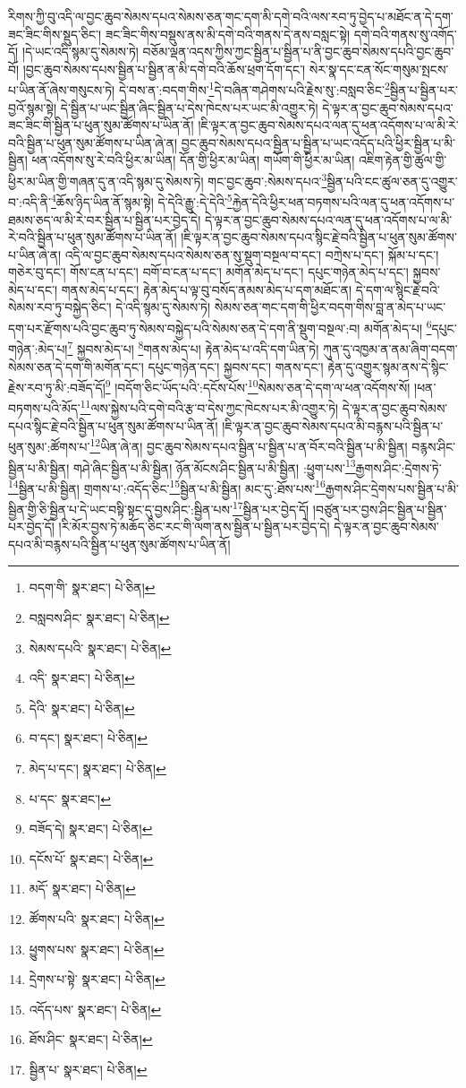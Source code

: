 རིགས་ཀྱི་བུ་འདི་ལ་བྱང་ཆུབ་སེམས་དཔའ་སེམས་ཅན་གང་དག་མི་དགེ་བའི་ལས་རབ་ཏུ་བྱེད་པ་མཐོང་ན་དེ་དག་ཟང་ཟིང་གིས་སྡུད་ཅིང་། ཟང་ཟིང་གིས་བསྡུས་ནས་མི་དགེ་བའི་གནས་དེ་ནས་བསླང་སྟེ། དགེ་བའི་གནས་སུ་འགོད་དོ། །དེ་ཡང་འདི་སྙམ་དུ་སེམས་ཏེ། བཅོམ་ལྡན་འདས་ཀྱིས་ཀྱང་སྦྱིན་པ་སྦྱིན་པ་ནི་བྱང་ཆུབ་སེམས་དཔའི་བྱང་ཆུབ་བོ། །བྱང་ཆུབ་སེམས་དཔས་སྦྱིན་པ་སྦྱིན་ན་མི་དགེ་བའི་ཆོས་ཕྲག་དོག་དང་། སེར་སྣ་དང་ངན་སོང་གསུམ་སྤངས་པ་ཡིན་ནོ་ཞེས་གསུངས་ཏེ། དེ་བས་ན་:བདག་གིས་\footnote{བདག་གི་  སྣར་ཐང་།  པེ་ཅིན། }དེ་བཞིན་གཤེགས་པའི་རྗེས་སུ་:བསླབ་ཅིང་\footnote{བསླབས་ཤིང་  སྣར་ཐང་།  པེ་ཅིན། }སྦྱིན་པ་སྦྱིན་པར་བྱའོ་སྙམ་སྟེ། དེ་སྦྱིན་པ་ཡང་སྦྱིན་ཞིང་སྦྱིན་པ་དེས་ཁེངས་པར་ཡང་མི་འགྱུར་ཏེ། དེ་ལྟར་ན་བྱང་ཆུབ་སེམས་དཔའ་ཟང་ཟིང་གི་སྦྱིན་པ་ཕུན་སུམ་ཚོགས་པ་ཡིན་ནོ། །ཇི་ལྟར་ན་བྱང་ཆུབ་སེམས་དཔའ་ལན་དུ་ཕན་འདོགས་པ་ལ་མི་རེ་བའི་སྦྱིན་པ་ཕུན་སུམ་ཚོགས་པ་ཡིན་ཞེ་ན། བྱང་ཆུབ་སེམས་དཔའ་སྦྱིན་པ་སྦྱིན་པ་ཡང་འདོད་པའི་ཕྱིར་སྦྱིན་པ་མི་སྦྱིན། ཕན་འདོགས་སུ་རེ་བའི་ཕྱིར་མ་ཡིན། དོན་གྱི་ཕྱིར་མ་ཡིན། གཡོག་གི་ཕྱིར་མ་ཡིན། འཇིག་རྟེན་གྱི་ཚུལ་གྱི་ཕྱིར་མ་ཡིན་གྱི་གཞན་དུ་ན་འདི་སྙམ་དུ་སེམས་ཏེ། གང་བྱང་ཆུབ་:སེམས་དཔའ་\footnote{སེམས་དཔའི་  སྣར་ཐང་།  པེ་ཅིན། }སྦྱིན་པའི་ངང་ཚུལ་ཅན་དུ་འགྱུར་བ་:འདི་ནི་\footnote{འདི་  སྣར་ཐང་།  པེ་ཅིན། }ཆོས་ཉིད་ཡིན་ནོ་སྙམ་སྟེ། དེ་དེའི་རྒྱུ་:དེ་དེའི་\footnote{དེའི་  སྣར་ཐང་།  པེ་ཅིན། }རྐྱེན་དེའི་ཕྱིར་ཕན་བཏགས་པའི་ལན་དུ་ཕན་འདོགས་པ་ཐམས་ཅད་ལ་མི་རེ་བར་སྦྱིན་པ་སྦྱིན་པར་བྱེད་དེ། དེ་ལྟར་ན་བྱང་ཆུབ་སེམས་དཔའ་ལན་དུ་ཕན་འདོགས་པ་ལ་མི་རེ་བའི་སྦྱིན་པ་ཕུན་སུམ་ཚོགས་པ་ཡིན་ནོ། །ཇི་ལྟར་ན་བྱང་ཆུབ་སེམས་དཔའ་སྙིང་རྗེ་བའི་སྦྱིན་པ་ཕུན་སུམ་ཚོགས་པ་ཡིན་ཞེ་ན། འདི་ལ་བྱང་ཆུབ་སེམས་དཔའ་སེམས་ཅན་སུ་སྡུག་བསྔལ་བ་དང་། བཀྲེས་པ་དང་། སྐོམ་པ་དང་། གཅེར་བུ་དང་། གོས་ངན་པ་དང་། བགོ་བ་ངན་པ་དང་། མགོན་མེད་པ་དང་། དཔུང་གཉེན་མེད་པ་དང་། སྐྱབས་མེད་པ་དང་། གནས་མེད་པ་དང་། རྟེན་མེད་པ་ལྟ་བུ་བསོད་ནམས་མེད་པ་དག་མཐོང་ན། དེ་དག་ལ་སྙིང་རྗེ་བའི་སེམས་རབ་ཏུ་བསྐྱེད་ཅིང་། དེ་འདི་སྙམ་དུ་སེམས་ཏེ། སེམས་ཅན་གང་དག་གི་ཕྱིར་བདག་གིས་བླ་ན་མེད་པ་ཡང་དག་པར་རྫོགས་པའི་བྱང་ཆུབ་ཏུ་སེམས་བསྐྱེད་པའི་སེམས་ཅན་དེ་དག་ནི་སྡུག་བསྔལ་:བ། མགོན་མེད་པ། \footnote{བ་དང་།    སྣར་ཐང་།  པེ་ཅིན། }དཔུང་གཉེན་:མེད་པ།\footnote{མེད་པ་དང་།  སྣར་ཐང་།  པེ་ཅིན། } སྐྱབས་མེད་པ། \footnote{པ་དང་  སྣར་ཐང་། }གནས་མེད་པ། རྟེན་མེད་པ་འདི་དག་ཡིན་ཏེ། ཀུན་དུ་འཁྱམ་ན་ནམ་ཞིག་བདག་སེམས་ཅན་དེ་དག་གི་མགོན་དང་། དཔུང་གཉེན་དང་། སྐྱབས་དང་། གནས་དང་། རྟེན་དུ་འགྱུར་སྙམ་ནས་དེ་སྙིང་རྗེས་རབ་ཏུ་མི་:བཟོད་དོ།\footnote{བཟོད་དེ།  སྣར་ཐང་།  པེ་ཅིན། } །བདོག་ཅིང་ཡོད་པའི་:དངོས་པོས་\footnote{དངོས་པོ་  སྣར་ཐང་།  པེ་ཅིན། }སེམས་ཅན་དེ་དག་ལ་ཕན་འདོགས་སོ། །ཕན་བཏགས་པའི་མོད་\footnote{མདོ་  སྣར་ཐང་།  པེ་ཅིན། }ལས་སྐྱེས་པའི་དགེ་བའི་རྩ་བ་དེས་ཀྱང་ཁེངས་པར་མི་འགྱུར་ཏེ། དེ་ལྟར་ན་བྱང་ཆུབ་སེམས་དཔའ་སྙིང་རྗེ་བའི་སྦྱིན་པ་ཕུན་སུམ་ཚོགས་པ་ཡིན་ནོ། །ཇི་ལྟར་ན་བྱང་ཆུབ་སེམས་དཔའ་མི་བརྙས་པའི་སྦྱིན་པ་ཕུན་སུམ་:ཚོགས་པ་\footnote{ཚོགས་པའི་  སྣར་ཐང་།  པེ་ཅིན། }ཡིན་ཞེ་ན། བྱང་ཆུབ་སེམས་དཔའ་སྦྱིན་པ་སྦྱིན་པ་ན་བོར་བའི་སྦྱིན་པ་མི་སྦྱིན། བརྙས་ཤིང་སྦྱིན་པ་མི་སྦྱིན། གཤེ་ཞིང་སྦྱིན་པ་མི་སྦྱིན། ཉོན་མོངས་ཤིང་སྦྱིན་པ་མི་སྦྱིན། :ཕྱུག་པས་\footnote{ཕྱུགས་པས་  སྣར་ཐང་།  པེ་ཅིན། }རྒྱགས་ཤིང་:དྲེགས་ཏེ་\footnote{དྲེགས་པ་སྟེ་  སྣར་ཐང་།  པེ་ཅིན། }སྦྱིན་པ་མི་སྦྱིན། གྲགས་པ་:འདོད་ཅིང་\footnote{འདོད་པས་  སྣར་ཐང་།  པེ་ཅིན། }སྦྱིན་པ་མི་སྦྱིན། མང་དུ་:ཐོས་པས་\footnote{ཐོས་ཤིང་  སྣར་ཐང་།  པེ་ཅིན། }རྒྱགས་ཤིང་དྲེགས་པས་སྦྱིན་པ་མི་སྦྱིན་གྱི་ཅི་སྦྱིན་པ་དེ་ཡང་བསྟི་སྟང་དུ་བྱས་ཤིང་:སྦྱིན་པས་\footnote{སྦྱིན་པ་  སྣར་ཐང་།  པེ་ཅིན། }སྦྱིན་པར་བྱེད་དོ། །བཙུན་པར་བྱས་ཤིང་སྦྱིན་པ་སྦྱིན་པར་བྱེད་དོ། །རི་མོར་བྱས་ཏེ་མཆོད་ཅིང་རང་གི་ལག་ནས་སྦྱིན་པ་སྦྱིན་པར་བྱེད་དེ། དེ་ལྟར་ན་བྱང་ཆུབ་སེམས་དཔའ་མི་བརྙས་པའི་སྦྱིན་པ་ཕུན་སུམ་ཚོགས་པ་ཡིན་ནོ། 
